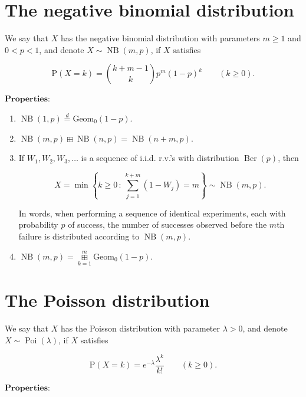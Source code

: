 \documentclass[11pt]{report}
\theoremstyle{plain}
\theoremstyle{definition}
\begin{document}
\section{The negative binomial distribution}
We say that $X$ has the negative binomial
distribution with parameters $m\ge1$ and $0<p<1$, and
denote $X\sim \operatorname{NB}(m,p)$, if $X$
satisfies

\[
\mathrm{P}(X=k) = \binom{k+m-1}{k} p^m (1-p)^k \qquad (k\ge 0).
\]

$\textbf{Properties:}$

\begin{enumerate}[label=\arabic*.]
\item $\operatorname{NB}(1,p) \stackrel{d}{=}
\operatorname{Geom_0}(1-p)$.

\item $\operatorname{NB}(m,p) \boxplus
\operatorname{NB}(n,p) = \operatorname{NB}(n+m,p)$.

\item If $W_1,W_2,W_3, \ldots$ is a sequence of i.i.d.
r.v.'s with distribution $\operatorname{Ber}(p)$,
then

\[
X = \min\left\{ k\ge 0\,:\, \sum_{j=1}^{k+m} (1-W_j) = m\right\}  \sim \operatorname{NB}(m,p).
\]

In words, when performing a sequence of identical
experiments, each with probability $p$ of success,
the number of successes observed before the $m$th
failure is distributed according to
$\operatorname{NB}(m,p)$.

\item $\operatorname{NB}(m,p) =
\mathop{\boxplus}\limits_{k=1}^m
\operatorname{Geom_0}(1-p)$.
\end{enumerate}

\section{The Poisson distribution}
We say that $X$ has the Poisson distribution with
parameter $\lambda>0$, and denote
$X\sim \operatorname{Poi}(\lambda)$, if $X$ satisfies

\[
\mathrm{P}(X=k) = e^{-\lambda} \frac{\lambda^k}{k!} \qquad (k\ge 0).
\]

$\textbf{Properties:}$
\end{document}
